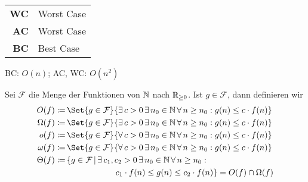 \documentclass{cheat-sheet}
\begin{document}

\begin{abk}
  \begin{tabular}{r l}
    \textbf{WC} & Worst Case \\
    \textbf{AC} & Worst Case \\
    \textbf{BC} & Best Case
  \end{tabular}
\end{abk}

\begin{alg}
  BC: $O(n)$; AC, WC: $O(n^2)$
\end{alg}

\begin{nota}
  Sei $\mathcal{F}$ die Menge der Funktionen von $\mathbb{N}$ nach $\mathbb{R}_{\geq 0}$. Ist $g \in \mathcal{F}$, dann definieren wir
  \begin{align*}
    O(f) \coloneqq& \, \Set{ g \in \mathcal{F} }{ \exists\,c > 0\,\exists\,n_0 \in \N\,\forall\,n \geq n_0 : g(n) \leq c \cdot f(n) } \\
    \Omega(f) \coloneqq& \, \Set{ g \in \mathcal{F} }{ \exists\,c > 0\,\exists\,n_0 \in \N\,\forall\,n \geq n_0 : g(n) \leq c \cdot f(n) } \\
    o(f) \coloneqq& \, \Set{ g \in \mathcal{F} }{ \forall\,c > 0\,\exists\,n_0 \in \N\,\forall\,n \geq n_0 : g(n) \leq c \cdot f(n) } \\
    \omega(f) \coloneqq& \, \Set{ g \in \mathcal{F} }{ \forall\,c > 0\,\exists\,n_0 \in \N\,\forall\,n \geq n_0 : g(n) \leq c \cdot f(n) } \\
    \Theta(f) \coloneqq& \, \{ g \in \mathcal{F} \,|\, \exists\,c_1, c_2 > 0\,\exists\,n_0 \in \N\,\forall\,n \geq n_0 : \\
    & \qquad \qquad \qquad c_1 \cdot f(n) \leq g(n) \leq c_2 \cdot f(n) \}
              = O(f) \cap \Omega(f) \\
  \end{align*}
\end{nota}
\end{document}
